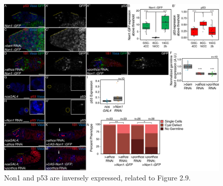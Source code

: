 \documentclass[12pt,oneside]{reedthesis}
\begin{document}
\begin{figure}

{\centering \includegraphics[width=7 in,height=5.409091 in]{./figure/Ribosome Biogenesis/Ribosome Biogenesis 5S} 

}

\caption[Non1 and p53 are inversely expressed, related to Figure 2.9.]{Non1 and p53 are inversely expressed, related to Figure 2.9.}\label{fig:unnamed-chunk-15}
\end{figure}
\end{document}
